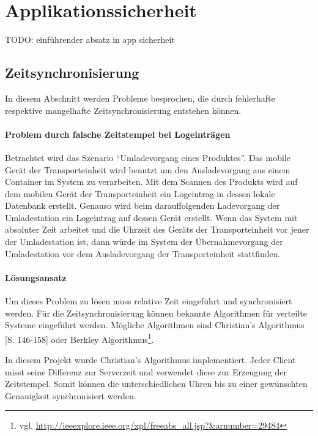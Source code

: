 \section{Applikationssicherheit}
\label{sec:security}

TODO: einführender absatz in app sicherheit

\subsection{Zeitsynchronisierung}
\label{subsec:timesync}

In diesem Abschnitt werden Probleme besprochen, die durch fehlerhafte respektive
	mangelhafte Zeitsynchronisierung entstehen können.

\paragraph{Problem durch falsche Zeitstempel bei Logeinträgen} Betrachtet wird das
	Szenario ``Umladevorgang eines Produktes''. Das mobile Gerät der Transporteinheit
	wird benutzt um den Ausladevorgang aus einem Container im System zu verarbeiten.
	Mit dem Scannen des Produkts wird auf dem mobilen Gerät der Transporteinheit ein
	Logeintrag in dessen lokale Datenbank erstellt. Genauso wird beim darauffolgenden 
	Ladevorgang der Umladestation ein Logeintrag auf dessen Gerät erstellt. Wenn das
	System mit absoluter Zeit arbeitet und die Uhrzeit des Geräts der Transporteinheit
	vor jener der Umladestation ist, dann würde im System der Übernahmevorgang der
	Umladestation vor dem Ausladevorgang der Transporteinheit stattfinden.


\paragraph{Lösungsansatz} Um dieses Problem zu lösen muss relative Zeit eingeführt und
	synchronisiert werden. Für die Zeitsynchronisierung können bekannte Algorithmen
	für verteilte Systeme eingeführt werden. Mögliche Algorithmen sind Christian's
	Algorithmus \cite{Christian89}[S. 146-158] oder Berkley Algorithmus\footnote{vgl.
	\url{http://ieeexplore.ieee.org/xpl/freeabs_all.jsp?&arnumber=29484}}.

In diesem Projekt wurde Christian's Algorithmus implementiert. Jeder Client misst seine
	Differenz zur Serverzeit und verwendet diese zur Erzeugung der Zeitstempel. Somit
	können die unterschiedlichen Uhren bis zu einer gewünschten Genauigkeit
	synchronisiert werden.

